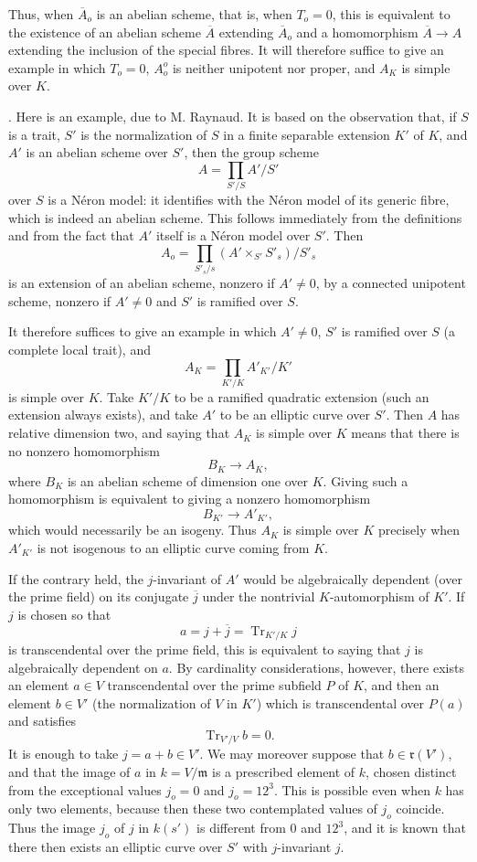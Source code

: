 Thus, when $\overline A_o$ is an abelian scheme, that is, when $T_o=0$,
this is equivalent to the existence of an abelian scheme $\overline A$
extending $\overline A_o$ and a homomorphism
$\overline A\longrightarrow A$ extending the inclusion of the special
fibres.  It will therefore suffice to give an example in which $T_o=0$,
$A_o^o$ is neither unipotent nor proper, and $A_K$ is simple over $K$.

\medskip
\noindent
{}. Here is an example, due to M. Raynaud.  It is based on the
observation that, if $S$ is a trait, $S'$ is the normalization of $S$
in a finite separable extension $K'$ of $K$, and $A'$ is an abelian
scheme over $S'$, then the group scheme
\[
 A=\prod_{S'/S} A'/S'
\]
over $S$ is a N\'eron model: it identifies with the N\'eron model of its
generic fibre, which is indeed an abelian scheme.  This follows
immediately from the definitions and from the fact that $A'$ itself is
a N\'eron model over $S'$.  Then
\[
 A_o=\prod_{S'_s/s}(A'\times_{S'}S'_s)/S'_s
\]
is an extension of an abelian scheme, nonzero if $A'\neq0$, by a
connected unipotent scheme, nonzero if $A'\neq0$ and $S'$ is ramified
over $S$.

It therefore suffices to give an example in which $A'\neq0$, $S'$ is
ramified over $S$ (a complete local trait), and
\[
 A_K=\prod_{K'/K}A'_{K'}/K'
\]
is simple over $K$.  Take $K'/K$ to be a ramified quadratic extension
(such an extension always exists), and take $A'$ to be an elliptic
curve over $S'$.  Then $A$ has relative dimension two, and saying that
$A_K$ is simple over $K$ means that there is no nonzero homomorphism
\[
 B_K\longrightarrow A_K,
\]
where $B_K$ is an abelian scheme of dimension one over $K$.  Giving
such a homomorphism is equivalent to giving a nonzero homomorphism
\[
 B_{K'}\longrightarrow A'_{K'},
\]
which would necessarily be an isogeny.  Thus $A_K$ is simple over $K$
precisely when $A'_{K'}$ is not isogenous to an elliptic curve coming
from $K$.

If the contrary held, the $j$-invariant of $A'$ would be algebraically
dependent (over the prime field) on its conjugate $\overline j$ under
the nontrivial $K$-automorphism of $K'$.  If $j$ is chosen so that
\[
 a=j+\overline j=\operatorname{Tr}_{K'/K}j
\]
is transcendental over the prime field, this is equivalent to saying
that $j$ is algebraically dependent on $a$.  By cardinality
considerations, however, there exists an element $a\in V$
transcendental over the prime subfield $P$ of $K$, and then an element
$b\in V'$ (the normalization of $V$ in $K'$) which is transcendental
over $P(a)$ and satisfies
\[
 \operatorname{Tr}_{V'/V}b=0.
\]
It is enough to take $j=a+b\in V'$.  We may moreover suppose that
$b\in\mathfrak r(V')$, and that the image of $a$ in
$k=V/\mathfrak m$ is a prescribed element of $k$, chosen distinct from
the exceptional values $j_o=0$ and $j_o=12^3$.  This is possible even
when $k$ has only two elements, because then these two contemplated
values of $j_o$ coincide.  Thus the image $j_o$ of $j$ in $k(s')$ is
different from $0$ and $12^3$, and it is known that there then exists
an elliptic curve over $S'$ with $j$-invariant $j$.

